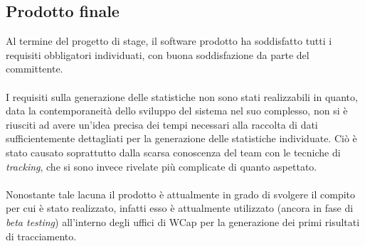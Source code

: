 \subsection{Prodotto finale}
Al termine del progetto di stage, il software prodotto ha soddisfatto tutti i requisiti obbligatori individuati, con buona soddisfazione da parte del committente. \\ \\
I requisiti sulla generazione delle statistiche non sono stati realizzabili in quanto, data la contemporaneità dello sviluppo del sistema nel suo complesso, non si è riusciti ad avere un'idea precisa dei tempi necessari alla raccolta di dati sufficientemente dettagliati per la generazione delle statistiche individuate. Ciò è stato causato soprattutto dalla scarsa conoscenza del team con le tecniche di \textit{tracking}, che si sono invece rivelate più complicate di quanto aspettato. \\ \\
Nonostante tale lacuna il prodotto è attualmente in grado di svolgere il compito per cui è stato realizzato, infatti esso è attualmente utilizzato (ancora in fase di \textit{beta testing}) all'interno degli uffici di WCap per la generazione dei primi risultati di tracciamento.

